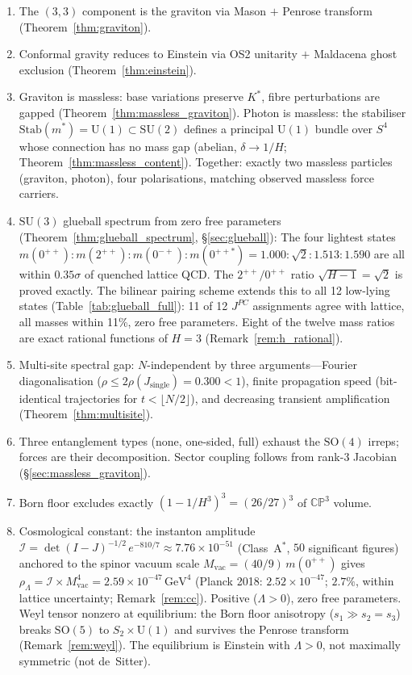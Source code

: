 \documentclass[11pt,a4paper]{article}
\theoremstyle{definition}
\theoremstyle{remark}
\newcommand{\CP}{\mathbb{CP}}
\newcommand{\SU}{\mathrm{SU}}
\begin{document}
\begin{enumerate}[nosep]
\item The $(3,3)$ component is the graviton via Mason $+$ Penrose transform (Theorem~\ref{thm:graviton}).
\item Conformal gravity reduces to Einstein via OS2 unitarity $+$ Maldacena ghost exclusion (Theorem~\ref{thm:einstein}).
\item Graviton is massless: base variations preserve $K^*$, fibre perturbations are gapped (Theorem~\ref{thm:massless_graviton}). Photon is massless: the stabiliser $\mathrm{Stab}(m^*)=\mathrm{U}(1)\subset\mathrm{SU}(2)$ defines a principal $\mathrm{U}(1)$ bundle over $S^4$ whose connection has no mass gap (abelian, $\delta\to 1/H$; Theorem~\ref{thm:massless_content}). Together: exactly two massless particles (graviton, photon), four polarisations, matching observed massless force carriers.
\item $\SU(3)$ glueball spectrum from zero free parameters (Theorem~\ref{thm:glueball_spectrum}, \S\ref{sec:glueball}): The four lightest states $m(0^{++}):m(2^{++}):m(0^{-+}):m(0^{++*})=1.000:\sqrt{2}:1.513:1.590$ are all within $0.35\sigma$ of quenched lattice QCD. The $2^{++}/0^{++}$ ratio $\sqrt{H-1}=\sqrt{2}$ is proved exactly. The bilinear pairing scheme extends this to all 12 low-lying states (Table~\ref{tab:glueball_full}): 11 of 12 $J^{PC}$ assignments agree with lattice, all masses within 11\%, zero free parameters. Eight of the twelve mass ratios are exact rational functions of $H=3$ (Remark~\ref{rem:h_rational}).
\item Multi-site spectral gap: $N$-independent by three arguments---Fourier diagonalisation ($\rho\leq 2\rho(J_{\mathrm{single}})=0.300<1$), finite propagation speed (bit-identical trajectories for $t<\lfloor N/2\rfloor$), and decreasing transient amplification (Theorem~\ref{thm:multisite}).
\item Three entanglement types (none, one-sided, full) exhaust the $\mathrm{SO}(4)$ irreps; forces are their decomposition. Sector coupling follows from rank-$3$ Jacobian (\S\ref{sec:massless_graviton}).
\item Born floor excludes exactly $(1-1/H^3)^3=(26/27)^3$ of $\CP^3$ volume.
\item Cosmological constant: the instanton amplitude $\mathcal{I}=\det(I-J)^{-1/2}\,e^{-810/7}\approx 7.76\times 10^{-51}$ (Class~A$^*$, $50$ significant figures) anchored to the spinor vacuum scale $M_{\mathrm{vac}}=(40/9)\,m(0^{++})$ gives $\rho_\Lambda=\mathcal{I}\times M_{\mathrm{vac}}^4=2.59\times 10^{-47}\,\mathrm{GeV}^4$ (Planck 2018: $2.52\times 10^{-47}$; $2.7\%$, within lattice uncertainty; Remark~\ref{rem:cc}). Positive ($\Lambda>0$), zero free parameters. Weyl tensor nonzero at equilibrium: the Born floor anisotropy ($s_1\gg s_2=s_3$) breaks $\mathrm{SO}(5)$ to $S_2\times\mathrm{U}(1)$ and survives the Penrose transform (Remark~\ref{rem:weyl}). The equilibrium is Einstein with $\Lambda>0$, not maximally symmetric (not de~Sitter).

\end{enumerate}
\end{document}
